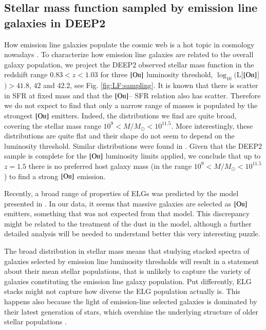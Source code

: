 \documentclass[onecolumn]{aa}
\newcommand{\OII}{$\left[\mathrm{O\textrm{\textsc{ii}}}\right]$\xspace}
\begin{document}
\subsection{Stellar mass function sampled by emission line galaxies in DEEP2}
\label{subsec:smf:elg}
How emission line galaxies populate the cosmic web is a hot topic in cosmology nowadays \citep{favole_2015_elg,2017MNRAS.472..550F,raichoor_2017MNRAS.471.3955R,2017arXiv170807628G}. 
To characterize how emission line galaxies are related to the overall galaxy population, we project the DEEP2 observed stellar mass function in the redshift range $0.83<z<1.03$ for three \OII luminosity threshold, $\log_{10}($L[\OII]$)>41.8$, 42 and 42.2, see Fig.  \ref{fig:LF:sampling}. 
It is known that there is scatter in SFR at fixed mass and that the \OII -- SFR relation also has scatter. 
Therefore we do not expect to find that only a narrow range of masses is populated by the strongest \OII emitters.
Indeed, the distributions we find are quite broad, covering the stellar mass range $10^9<M/M_{\odot}<10^{11.5}$. 
More interestingly, these distributions are quite flat and their shape do not seem to depend on the luminosity threshold. 
Similar distributions were found in \citet{raichoor_2017MNRAS.471.3955R}. 
Given that the DEEP2 sample is complete for the \OII luminosity limits applied, we  conclude that up to $z=1.5$ there is no preferred host galaxy mass (in the range $10^9<M/M_{\odot}<10^{11.5}$) to find a strong \OII emission.

Recently, a broad range of properties of ELGs was predicted by the model presented in \citet{2017arXiv170807628G}. 
In our data, it seems that massive galaxies are selected as \OII emitters, something that was not expected from that model. 
This discrepancy might be related to the treatment of the dust in the model, although a further detailed analysis will be needed to understand better this very interesting puzzle.

The broad distribution in stellar mass means that studying stacked spectra of galaxies selected by emission line luminosity thresholds will result in a statement about their mean stellar populations, that is unlikely to capture the variety of galaxies constituting the emission line galaxy population.
Put differently, ELG stacks might not capture how diverse the ELG population actually is.  
This happens also because the light of emission-line selected galaxies is dominated by their latest generation of stars, which overshine the underlying structure of older stellar populations \citep[known as the 'iceberg effect'][]{2010MNRAS.407..830M}. 
\end{document}
